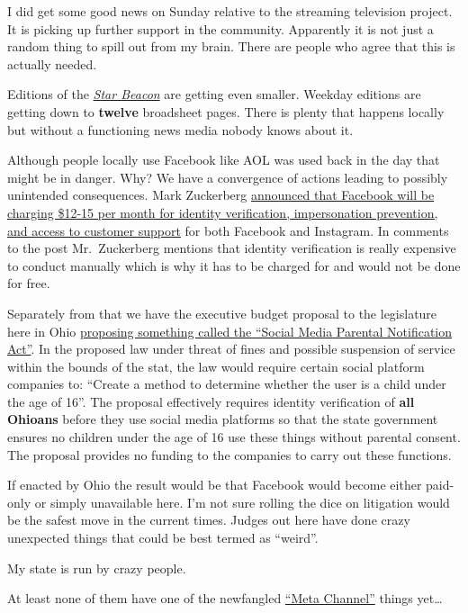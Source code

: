 I did get some good news on Sunday relative to the streaming television
project. It is picking up further support in the community. Apparently
it is not just a random thing to spill out from my brain. There are
people who agree that this is actually needed.

Editions of the \href{https://www.starbeacon.com/}{\emph{Star Beacon}}
are getting even smaller. Weekday editions are getting down to
\textbf{twelve} broadsheet pages. There is plenty that happens locally
but without a functioning news media nobody knows about it.

Although people locally use Facebook like AOL was used back in the day
that might be in danger. Why? We have a convergence of actions leading
to possibly unintended consequences. Mark Zuckerberg
\href{http://web.archive.org/web/20230219174828/https://www.facebook.com/zuck/posts/pfbid02979GyAHwTKsMd7ngCiHTRCHyeTCEHwYe9Evq3YV2ffvxUY7fKVb9TGyKEUFBeo3kl}{announced
that Facebook will be charging \$12-15 per month for identity
verification, impersonation prevention, and access to customer support}
for both Facebook and Instagram. In comments to the post Mr.~Zuckerberg
mentions that identity verification is really expensive to conduct
manually which is why it has to be charged for and would not be done for
free.

Separately from that we have the executive budget proposal to the
legislature here in Ohio
\href{http://web.archive.org/web/20230218064633/https://governor.ohio.gov/administration/lt-governor/020823}{proposing
something called the ``Social Media Parental Notification Act''}. In the
proposed law under threat of fines and possible suspension of service
within the bounds of the stat, the law would require certain social
platform companies to: ``Create a method to determine whether the user
is a child under the age of 16''. The proposal effectively requires
identity verification of \textbf{all Ohioans} before they use social
media platforms so that the state government ensures no children under
the age of 16 use these things without parental consent. The proposal
provides no funding to the companies to carry out these functions.

If enacted by Ohio the result would be that Facebook would become either
paid-only or simply unavailable here. I'm not sure rolling the dice on
litigation would be the safest move in the current times. Judges out
here have done crazy unexpected things that could be best termed as
``weird''.

My state is run by crazy people.

At least none of them have one of the newfangled
\href{https://web.archive.org/web/20230219092604/https://www.theverge.com/2023/2/16/23602833/meta-instagram-channels-telegram-facebook-messenger}{``Meta
Channel''} things yet\ldots{}
